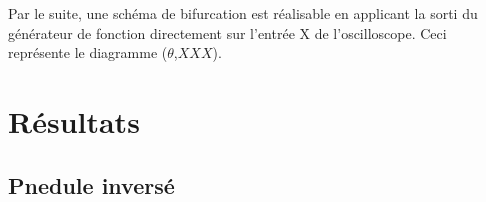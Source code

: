 \documentclass[a4paper,12pt,oneside]{article}
\begin{document}
Par le suite, une schéma de bifurcation est réalisable en applicant la sorti du générateur de fonction directement sur l'entrée X de l'oscilloscope. Ceci représente le diagramme ($\theta$,$XXX$).%

\section{Résultats}

\subsection{Pnedule inversé}

\end{document}
